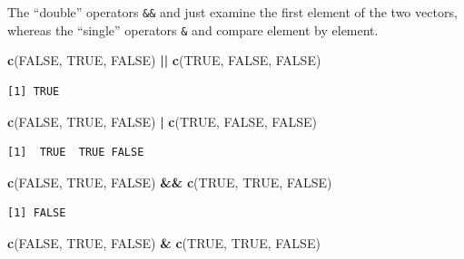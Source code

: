 \documentclass[
]{krantz}
\makeatletter
\newenvironment{Shaded}{\begin{snugshade}}{\end{snugshade}}
\newcommand{\KeywordTok}[1]{\textcolor[rgb]{0.27,0.27,0.27}{\textbf{#1}}}
\newcommand{\NormalTok}[1]{#1}
\newcommand{\OperatorTok}[1]{\textcolor[rgb]{0.43,0.43,0.43}{\textbf{#1}}}
\newcommand{\OtherTok}[1]{\textcolor[rgb]{0.37,0.37,0.37}{#1}}
\newcommand{\StringTok}[1]{\textcolor[rgb]{0.5,0.5,0.5}{#1}}
\newenvironment{kframe}{%
\medskip{}
\setlength{\fboxsep}{.8em}
 \def\at@end@of@kframe{}%
 \ifinner\ifhmode%
  \def\at@end@of@kframe{\end{minipage}}%
  \begin{minipage}{\columnwidth}%
 \fi\fi%
 \def\FrameCommand##1{\hskip\@totalleftmargin \hskip-\fboxsep
 \colorbox{shadecolor}{##1}\hskip-\fboxsep
     \hskip-\linewidth \hskip-\@totalleftmargin \hskip\columnwidth}%
 \MakeFramed {\advance\hsize-\width
   \@totalleftmargin\z@ \linewidth\hsize
   \@setminipage}}%
 {\par\unskip\endMakeFramed%
 \at@end@of@kframe}
\renewenvironment{Shaded}{\begin{kframe}}{\end{kframe}}
\makeatother
\begin{document}
The ``double'' operators \texttt{\&\&} and \texttt{\textbar{}\textbar{}} just examine the first element of the two vectors, whereas the ``single'' operators \texttt{\&} and \texttt{\textbar{}} compare element by element.

\begin{Shaded}
\begin{Highlighting}[]
\KeywordTok{c}\NormalTok{(}\OtherTok{FALSE}\NormalTok{, }\OtherTok{TRUE}\NormalTok{, }\OtherTok{FALSE}\NormalTok{) }\OperatorTok{||}\StringTok{ }\KeywordTok{c}\NormalTok{(}\OtherTok{TRUE}\NormalTok{, }\OtherTok{FALSE}\NormalTok{, }\OtherTok{FALSE}\NormalTok{)}
\end{Highlighting}
\end{Shaded}

\begin{verbatim}
[1] TRUE
\end{verbatim}

\begin{Shaded}
\begin{Highlighting}[]
\KeywordTok{c}\NormalTok{(}\OtherTok{FALSE}\NormalTok{, }\OtherTok{TRUE}\NormalTok{, }\OtherTok{FALSE}\NormalTok{) }\OperatorTok{|}\StringTok{ }\KeywordTok{c}\NormalTok{(}\OtherTok{TRUE}\NormalTok{, }\OtherTok{FALSE}\NormalTok{, }\OtherTok{FALSE}\NormalTok{)}
\end{Highlighting}
\end{Shaded}

\begin{verbatim}
[1]  TRUE  TRUE FALSE
\end{verbatim}

\begin{Shaded}
\begin{Highlighting}[]
\KeywordTok{c}\NormalTok{(}\OtherTok{FALSE}\NormalTok{, }\OtherTok{TRUE}\NormalTok{, }\OtherTok{FALSE}\NormalTok{) }\OperatorTok{\&\&}\StringTok{ }\KeywordTok{c}\NormalTok{(}\OtherTok{TRUE}\NormalTok{, }\OtherTok{TRUE}\NormalTok{, }\OtherTok{FALSE}\NormalTok{)}
\end{Highlighting}
\end{Shaded}

\begin{verbatim}
[1] FALSE
\end{verbatim}

\begin{Shaded}
\begin{Highlighting}[]
\KeywordTok{c}\NormalTok{(}\OtherTok{FALSE}\NormalTok{, }\OtherTok{TRUE}\NormalTok{, }\OtherTok{FALSE}\NormalTok{) }\OperatorTok{\&}\StringTok{ }\KeywordTok{c}\NormalTok{(}\OtherTok{TRUE}\NormalTok{, }\OtherTok{TRUE}\NormalTok{, }\OtherTok{FALSE}\NormalTok{)}
\end{Highlighting}
\end{Shaded}
\end{document}
